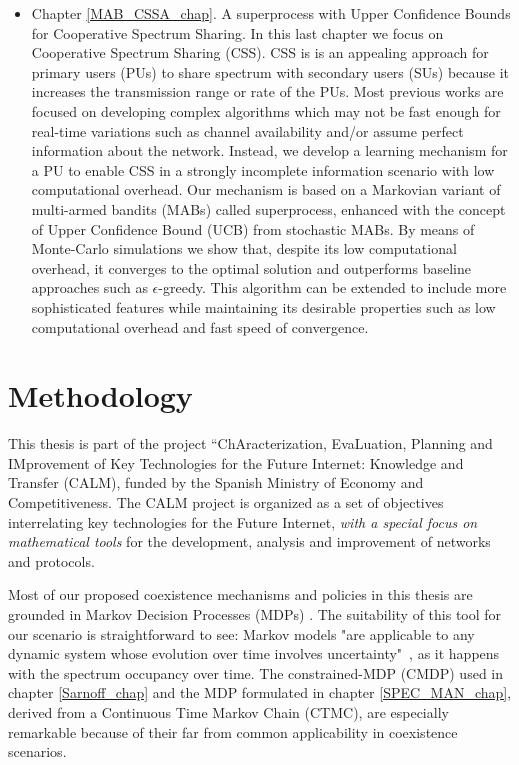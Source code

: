 \begin{itemize}
\item Chapter \ref{MAB_CSSA_chap}. A superprocess with Upper Confidence Bounds for Cooperative Spectrum Sharing. In this last chapter we focus on Cooperative Spectrum Sharing (CSS). CSS is is an appealing approach for primary users (PUs) to share spectrum with secondary users (SUs) because it increases the transmission range or rate of the PUs. Most previous works are focused on developing complex algorithms which may not be fast enough for real-time variations such as channel availability and/or assume perfect information about the network. Instead, we develop a learning mechanism for a PU to enable CSS in a strongly incomplete information scenario with low computational overhead. Our mechanism is based on a Markovian variant of multi-armed bandits (MABs) called superprocess, enhanced with the concept of Upper Confidence Bound (UCB) from stochastic MABs. By means of Monte-Carlo simulations we show that, despite its low computational overhead, it converges to the optimal solution and outperforms baseline approaches such as $\epsilon$-greedy. This algorithm can be extended to include more sophisticated features while maintaining its desirable properties such as low computational overhead and fast speed of convergence. 
\end{itemize}

\section{Methodology}
This thesis is part of the project “ChAracterization, EvaLuation, Planning and IMprovement of Key Technologies for the Future Internet: Knowledge and Transfer (CALM), funded by the Spanish Ministry of Economy and Competitiveness. The CALM project is organized as a set of objectives interrelating key technologies for the Future Internet, \emph{with a special focus on mathematical tools} for the development, analysis and improvement of networks and protocols.

Most of our proposed coexistence mechanisms and policies in this thesis are grounded in Markov Decision Processes (MDPs) \cite{ref:Puterman2005}. The suitability of this tool for our scenario is straightforward to see: Markov models "are applicable to any dynamic system whose evolution over time involves uncertainty" \cite{ref:Bertsekas}, as it happens with the spectrum occupancy over time. The constrained-MDP (CMDP) used in chapter \ref{Sarnoff_chap} and the MDP formulated in chapter \ref{SPEC_MAN_chap}, derived from a Continuous Time Markov Chain (CTMC), are especially remarkable because of their far from common applicability in coexistence scenarios.  

